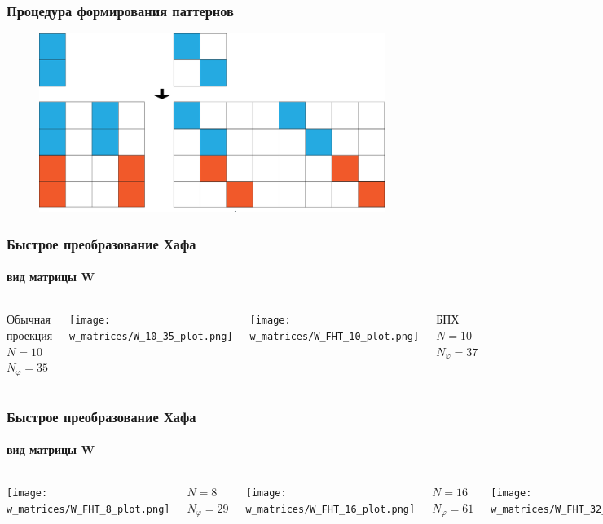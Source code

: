 \begin{frame}
\frametitle{Процедура формирования паттернов}
  \begin{figure}
  \centering
    \includegraphics[width=1\textwidth]{../Dissertation/images/part1_img/hough_proc}
  \end{figure}
\end{frame}

\begin{frame}
\frametitle{Быстрое преобразование Хафа}
\framesubtitle{вид матрицы W}
\centering
\begin{columns}

Обычная проекция \\
$N = 10$ \\
$N_\varphi = 35$

\texttt{[image: w\_matrices/W\_10\_35\_plot.png]}

\texttt{[image: w\_matrices/W\_FHT\_10\_plot.png]}

БПХ \\
$N = 10$ \\
$N_\varphi = 37$ \\
\end{columns}
\end{frame}

\begin{frame}
\frametitle{Быстрое преобразование Хафа}
\framesubtitle{вид матрицы W}
\centering
\begin{columns}

\texttt{[image: w\_matrices/W\_FHT\_8\_plot.png]}

$N = 8$ \\
$N_\varphi = 29$

\texttt{[image: w\_matrices/W\_FHT\_16\_plot.png]}

$N = 16$ \\
$N_\varphi = 61$


\texttt{[image: w\_matrices/W\_FHT\_32\_plot.png]}

$N = 32$ \\
$N_\varphi = 125$ \\

\end{columns}

\end{frame}

